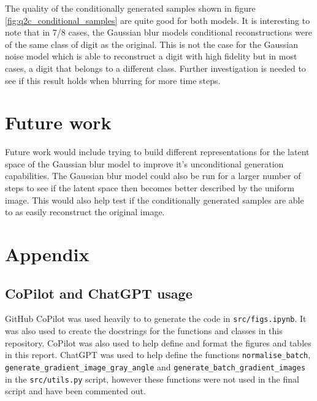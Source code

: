 \documentclass[11pt]{article}
\begin{document}
The quality of the conditionally generated samples shown in figure \ref{fig:q2c_conditional_samples} are quite good for both models. It is interesting to note that in 7/8 cases, the Gaussian blur models conditional reconstructions were of the same class of digit as the original. This is not the case for the Gaussian noise model which is able to reconstruct a digit with high fidelity but in most cases, a digit that belongs to a different class. Further investigation is needed to see if this result holds when blurring for more time steps.
\section{Future work}
Future work would include trying to build different representations for the latent space of the Gaussian blur model to improve it's unconditional generation capabilities. The Gaussian blur model could also be run for a larger number of steps to see if the latent space then becomes better described by the uniform image. This would also help test if the conditionally generated samples are able to as easily reconstruct the original image.




\section{Appendix}
\subsection{CoPilot and ChatGPT usage}
GitHub CoPilot was used heavily to to generate the code in \texttt{src/figs.ipynb}. It was also used to create the docstrings for the functions and classes in this repository. CoPilot was also used to help define and format the figures and tables in this report. ChatGPT was used to help define the functions \texttt{normalise\_batch}, \texttt{generate\_gradient\_image\_gray\_angle} and \texttt{generate\_batch\_gradient\_images} in the \texttt{src/utils.py} script, however these functions were not used in the final script and have been commented out.
\end{document}

